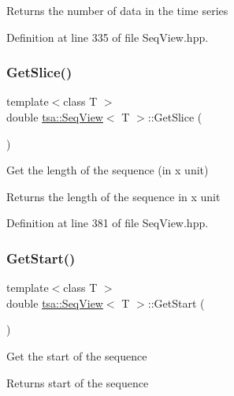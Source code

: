 \begin{DoxyReturn}{Returns}
the number of data in the time series 
\end{DoxyReturn}


Definition at line 335 of file Seq\+View.\+hpp.

\mbox{\label{classtsa_1_1_seq_view_a4241f9e722f288455a7a3e5168b60d63}} 
\subsubsection{\texorpdfstring{Get\+Slice()}{GetSlice()}}
{\footnotesize\ttfamily template$<$class T $>$ \\
double \hyperlink{classtsa_1_1_seq_view}{tsa\+::\+Seq\+View}$<$ T $>$\+::Get\+Slice (\begin{DoxyParamCaption}{ }\end{DoxyParamCaption})\hspace{0.3cm}{\ttfamily [inline]}}

Get the length of the sequence (in x unit)

\begin{DoxyReturn}{Returns}
the length of the sequence in x unit 
\end{DoxyReturn}


Definition at line 381 of file Seq\+View.\+hpp.

\mbox{\label{classtsa_1_1_seq_view_a30b6045b2c1020988221906b68760842}} 
\subsubsection{\texorpdfstring{Get\+Start()}{GetStart()}}
{\footnotesize\ttfamily template$<$class T $>$ \\
double \hyperlink{classtsa_1_1_seq_view}{tsa\+::\+Seq\+View}$<$ T $>$\+::Get\+Start (\begin{DoxyParamCaption}{ }\end{DoxyParamCaption})\hspace{0.3cm}{\ttfamily [inline]}}

Get the start of the sequence

\begin{DoxyReturn}{Returns}
start of the sequence 
\end{DoxyReturn}


